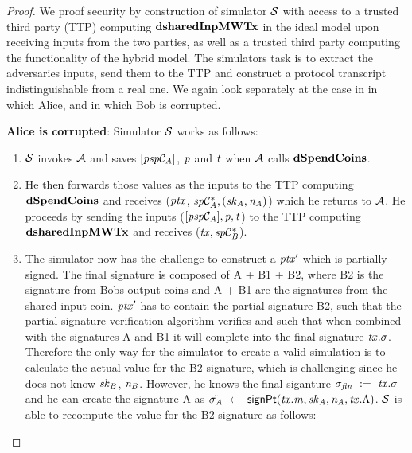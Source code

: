 \begin{proof}
    We proof security by construction of simulator $\mathcal{S}$ with access to a trusted third party (TTP) computing $\mathbf{dsharedInpMWTx}$ in the ideal model upon receiving inputs from the two parties, as well as a trusted third party computing the functionality of the hybrid model.
    The simulators task is to extract the adversaries inputs, send them to the TTP and construct a protocol transcript indistinguishable from a real one.
    We again look separately at the case in in which Alice, and in which Bob is corrupted.

    \textbf{Alice is corrupted}: Simulator $\mathcal{S}$ works as follows:
    \begin{enumerate}
        \item $\mathcal{S}$ invokes $\mathcal{A}$ and saves $[\mathit{psp}\mathcal{C}_{\mathit{A}}]$, $\mathit{p}$ and $\mathit{t}$ when $\mathcal{A}$ calls $\mathbf{dSpendCoins}$.
        \item He then forwards those values as the inputs to the TTP computing $\mathbf{dSpendCoins}$ and receives ($\mathit{ptx}$, $\mathit{sp}\mathcal{C}_{\mathit{A}}^*, (\mathit{sk}_{\mathit{A}}, \mathit{\mathit{n}_{\mathit{A}}})$) which he returns to $\mathcal{A}$.
        He proceeds by sending the inputs ($[\mathit{psp}\mathcal{C}_{\mathit{A}}], \mathit{p}, \mathit{t}$) to the TTP computing $\mathbf{dsharedInpMWTx}$ and receives ($\mathit{tx}, \mathit{sp}\mathcal{C}_{\mathit{B}}^*$).
        \item The simulator now has the challenge to construct a ${\mathit{ptx}}'$ which is partially signed.
        The final signature is composed of A + B1 + B2, where B2 is the signature from Bobs output coins and A + B1 are the signatures from the shared input coin.
        ${\mathit{ptx}}'$ has to contain the partial signature B2, such that the partial signature verification algorithm verifies and such that when combined with the signatures A and B1 it will complete into the final signature $\mathit{tx}.\sigma$.
        Therefore the only way for the simulator to create a valid simulation is to calculate the actual value for the B2 signature, which is challenging since he does not know $\mathit{sk}_{\mathit{B}}$, $\mathit{\mathit{n}_{\mathit{B}}}$.
        However, he knows the final siganture $\sigma_{\mathit{fin}} ~:=~ \mathit{tx}.\sigma$ and he can create the signature A as $\tilde{\sigma_{\mathit{A}}} ~\leftarrow~ \mathsf{signPt}(\mathit{tx}.\mathit{m}, \mathit{sk}_{\mathit{A}}, \mathit{\mathit{n}_{\mathit{A}}}, \mathit{tx}.\Lambda)$.
        $\mathcal{S}$ is able to recompute the value for the B2 signature as follows:

\end{enumerate}
\end{proof}

